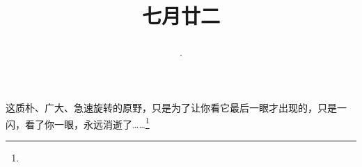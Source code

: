 \title{\date[d=25,m=8,y=2024][year:cn-y,年,month:cn,day:cn,日,·,weekday]·七月廿二 }
这质朴、广大、急速旋转的原野，只是为了让你看它最后一眼才出现的，只是一闪，看了你一眼，永远消逝了……\footnote{ }

